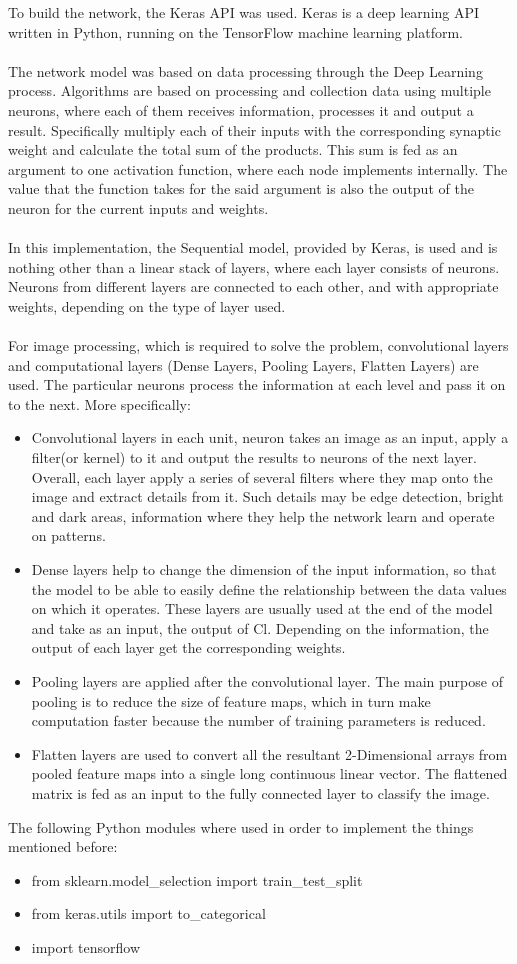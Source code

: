 To build the network, the Keras API was used. Keras is a deep learning API written in Python, running on the TensorFlow machine learning platform.\\~\\
The network model was based on data processing through the Deep Learning process. Algorithms are based on processing and collection
data using multiple neurons, where each of them receives information, processes it and output a result. Specifically multiply each of their inputs with the corresponding synaptic weight and calculate the total sum of the products. This sum is fed as an argument to one
activation function, where each node implements internally. The value that the function takes for the said argument is also the output of the neuron for the current inputs and weights. \\~\\
In this implementation, the Sequential model, provided by Keras, is used and is nothing other than a linear stack of layers, where each layer consists of neurons. Neurons from different layers are connected to each other, and with appropriate weights, depending on the type of layer used.\\~\\
For image processing, which is required to solve the problem, convolutional layers and computational layers (Dense Layers, Pooling Layers, Flatten Layers) are used. The particular neurons process the information at each level and pass it on to the next. More specifically:
\begin{itemize}
\item Convolutional layers in each unit, neuron takes an image as an input, apply a filter(or kernel) to it and output the results to neurons of the next layer. Overall, each layer apply a series of several filters where they map onto the image and extract details from it. Such details may be edge detection, bright and dark areas, information where they help the network learn and operate on patterns. 
\item Dense layers help to change the dimension of the input information, so that the model to be able to easily define the relationship between the data values on which it operates. These layers are usually used at the end of the model and take as an input, the output of Cl. Depending on the information, the output of each layer get the corresponding weights.
\item Pooling layers are applied after the convolutional layer. The main purpose of pooling is to reduce the size of feature maps, which in turn make computation faster because the number of training parameters is reduced.
\item Flatten layers are used to convert all the resultant 2-Dimensional arrays from pooled feature maps into a single long continuous linear vector. The flattened matrix is fed as an input to the fully connected layer to classify the image.
\end{itemize}
The following Python modules where used in order to implement the things mentioned before:
\begin{itemize}
  \item from sklearn.model\_selection import train\_test\_split
  \item from keras.utils import to\_categorical
  \item import tensorflow 
\end{itemize}